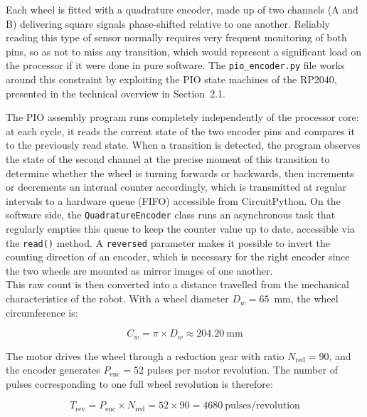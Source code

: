 \documentclass[12pt,a4paper]{report}
\begin{document}
	Each wheel is fitted with a quadrature encoder, made up of two channels (A and B) delivering square signals phase-shifted relative to one another. Reliably reading this type of sensor normally requires very frequent monitoring of both pins, so as not to miss any transition, which would represent a significant load on the processor if it were done in pure software. The \texttt{pio\_encoder.py} file works around this constraint by exploiting the PIO state machines of the RP2040, presented in the technical overview in Section~2.1.
	
	The PIO assembly program runs completely independently of the processor core: at each cycle, it reads the current state of the two encoder pins and compares it to the previously read state. When a transition is detected, the program observes the state of the second channel at the precise moment of this transition to determine whether the wheel is turning forwards or backwards, then increments or decrements an internal counter accordingly, which is transmitted at regular intervals to a hardware queue (FIFO) accessible from CircuitPython. On the software side, the \texttt{QuadratureEncoder} class runs an asynchronous task that regularly empties this queue to keep the counter value up to date, accessible via the \texttt{read()} method. A \texttt{reversed} parameter makes it possible to invert the counting direction of an encoder, which is necessary for the right encoder since the two wheels are mounted as mirror images of one another.\\
	
	This raw count is then converted into a distance travelled from the mechanical characteristics of the robot. With a wheel diameter $D_w = 65$~mm, the wheel circumference is:
	
	\begin{equation}
		C_w = \pi \times D_w \approx 204.20\ \text{mm}
		\label{eq:circumference}
	\end{equation}
	
	The motor drives the wheel through a reduction gear with ratio $N_{\text{red}} = 90$, and the encoder generates $P_{\text{enc}} = 52$ pulses per motor revolution. The number of pulses corresponding to one full wheel revolution is therefore:
	
	\begin{equation}
		T_{\text{rev}} = P_{\text{enc}} \times N_{\text{red}} = 52 \times 90 = 4680\ \text{pulses/revolution}
		\label{eq:ticks-per-rev}
	\end{equation}
	
\end{document}

